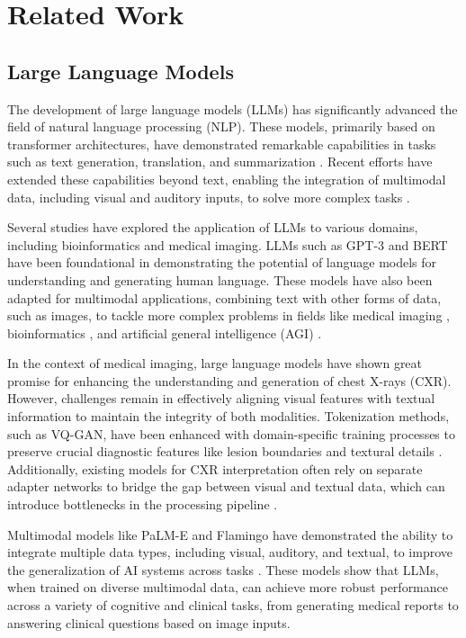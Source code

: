 \section{Related Work}
\subsection{Large Language Models}
The development of large language models (LLMs) has significantly advanced the field of natural language processing (NLP). These models, primarily based on transformer architectures, have demonstrated remarkable capabilities in tasks such as text generation, translation, and summarization \cite{zhou2023style,zhou2021improving,zhou2021modeling}. Recent efforts have extended these capabilities beyond text, enabling the integration of multimodal data, including visual and auditory inputs, to solve more complex tasks \cite{zhou2023improving}.

Several studies have explored the application of LLMs to various domains, including bioinformatics and medical imaging. LLMs such as GPT-3 and BERT have been foundational in demonstrating the potential of language models for understanding and generating human language. These models have also been adapted for multimodal applications, combining text with other forms of data, such as images, to tackle more complex problems in fields like medical imaging \cite{ratzlaff2024training}, bioinformatics \cite{garg2023multimodal}, and artificial general intelligence (AGI) \cite{xu2024introspection,zhou2024visual}.

In the context of medical imaging, large language models have shown great promise for enhancing the understanding and generation of chest X-rays (CXR). However, challenges remain in effectively aligning visual features with textual information to maintain the integrity of both modalities. Tokenization methods, such as VQ-GAN, have been enhanced with domain-specific training processes to preserve crucial diagnostic features like lesion boundaries and textural details \cite{bucciarelli2024personalizing}. Additionally, existing models for CXR interpretation often rely on separate adapter networks to bridge the gap between visual and textual data, which can introduce bottlenecks in the processing pipeline \cite{xu2024introspection}.

Multimodal models like PaLM-E and Flamingo have demonstrated the ability to integrate multiple data types, including visual, auditory, and textual, to improve the generalization of AI systems across tasks \cite{song2024exploring}. These models show that LLMs, when trained on diverse multimodal data, can achieve more robust performance across a variety of cognitive and clinical tasks, from generating medical reports to answering clinical questions based on image inputs.

